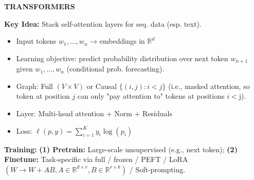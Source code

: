 \documentclass[a4paper,10pt]{article}
\newcommand{\subtitle}[1]{\vspace{0.25cm}\begin{normalsize}\textbf{\textcolor{gray!150}{\uppercase{#1}}}\end{normalsize}}
\begin{document}
\begin{small}
\subtitle{Transformers}

\textbf{Key Idea:} Stack self-attention layers for seq. data (esp. text).

\begin{itemize}
    \item Input tokens $w_1,...,w_n$ → embeddings in $\mathbb{R}^d$
    \item Learning objective: predict probability distribution over next token $w_{n+1}$ given $w_1,...,w_n$ (conditional prob. forecasting).
    \item Graph: Full $(V\times V)$ or Causal $\{(i,j): i<j\}$ (i.e., masked attention, so  token at position $j$ can only "pay attention to" tokens at positions $i< $j).
    \item Layer: Multi-head attention + Norm + Residuals
    \item Loss: $\ell(p,y)=\sum_{i=1}^K y_i\log(p_i)$
\end{itemize}

\textbf{Training:}
\textbf{(1) Pretrain:} Large-scale unsupervised (e.g., next token); \textbf{(2) Finetune:} Task-specific via full / frozen / PEFT / LoRA $(W \to W + AB, A\in\mathbb{R}^{d\times r}, B\in\mathbb{R}^{r\times k})$ / Soft-prompting.

\end{small}
\end{document}
